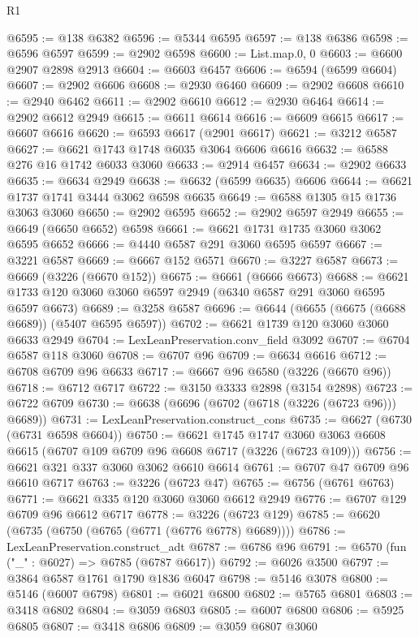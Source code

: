 \begin{lexlean}{R1}
\begin{coremodule}
@6595 := @138 @6382
@6596 := @5344 @6595
@6597 := @138 @6386
@6598 := @6596 @6597
@6599 := @2902 @6598
@6600 := List.map.{0, 0}
@6603 := @6600 @2907 @2898 @2913
@6604 := @6603 @6457
@6606 := @6594 (@6599 @6604)
@6607 := @2902 @6606
@6608 := @2930 @6460
@6609 := @2902 @6608
@6610 := @2940 @6462
@6611 := @2902 @6610
@6612 := @2930 @6464
@6614 := @2902 @6612 @2949
@6615 := @6611 @6614
@6616 := @6609 @6615
@6617 := @6607 @6616
@6620 := @6593 @6617 (@2901 @6617)
@6621 := @3212 @6587
@6627 := @6621 @1743 @1748 @6035 @3064 @6606 @6616
@6632 := @6588 @276 @16 @1742 @6033 @3060
@6633 := @2914 @6457
@6634 := @2902 @6633
@6635 := @6634 @2949
@6638 := @6632 (@6599 @6635) @6606
@6644 := @6621 @1737 @1741 @3444 @3062 @6598 @6635
@6649 := @6588 @1305 @15 @1736 @3063 @3060
@6650 := @2902 @6595
@6652 := @2902 @6597 @2949
@6655 := @6649 (@6650 @6652) @6598
@6661 := @6621 @1731 @1735 @3060 @3062 @6595 @6652
@6666 := @4440 @6587 @291 @3060 @6595 @6597
@6667 := @3221 @6587
@6669 := @6667 @152 @6571
@6670 := @3227 @6587
@6673 := @6669 (@3226 (@6670 @152))
@6675 := @6661 (@6666 @6673)
@6688 := @6621 @1733 @120 @3060 @3060 @6597 @2949 (@6340 @6587 @291 @3060 @6595 @6597 @6673)
@6689 := @3258 @6587
@6696 := @6644 (@6655 (@6675 (@6688 @6689)) (@5407 @6595 @6597))
@6702 := @6621 @1739 @120 @3060 @3060 @6633 @2949
@6704 := LexLeanPreservation.conv_field @3092
@6707 := @6704 @6587 @118 @3060
@6708 := @6707 @96
@6709 := @6634 @6616
@6712 := @6708 @6709 @96 @6633
@6717 := @6667 @96 @6580 (@3226 (@6670 @96))
@6718 := @6712 @6717
@6722 := @3150 @3333 @2898 (@3154 @2898)
@6723 := @6722 @6709
@6730 := @6638 (@6696 (@6702 (@6718 (@3226 (@6723 @96))) @6689))
@6731 := LexLeanPreservation.construct_cons
@6735 := @6627 (@6730 (@6731 @6598 @6604))
@6750 := @6621
    @1745
    @1747
    @3060
    @3063
    @6608
    @6615
    (@6707 @109 @6709 @96 @6608 @6717 (@3226 (@6723 @109)))
@6756 := @6621 @321 @337 @3060 @3062 @6610 @6614
@6761 := @6707 @47 @6709 @96 @6610 @6717
@6763 := @3226 (@6723 @47)
@6765 := @6756 (@6761 @6763)
@6771 := @6621 @335 @120 @3060 @3060 @6612 @2949
@6776 := @6707 @129 @6709 @96 @6612 @6717
@6778 := @3226 (@6723 @129)
@6785 := @6620 (@6735 (@6750 (@6765 (@6771 (@6776 @6778) @6689))))
@6786 := LexLeanPreservation.construct_adt
@6787 := @6786 @96
@6791 := @6570 (fun ("_" : @6027) => @6785 (@6787 @6617))
@6792 := @6026 @3500
@6797 := @3864 @6587 @1761 @1790 @1836 @6047
@6798 := @5146 @3078
@6800 := @5146 (@6007 @6798)
@6801 := @6021 @6800
@6802 := @5765 @6801
@6803 := @3418 @6802
@6804 := @3059 @6803
@6805 := @6007 @6800
@6806 := @5925 @6805
@6807 := @3418 @6806
@6809 := @3059 @6807 @3060

\end{coremodule}
\end{lexlean}
